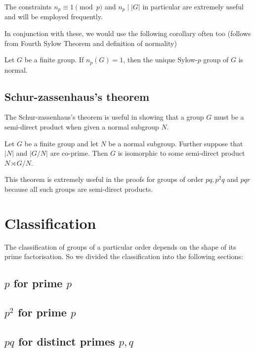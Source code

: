 The constraints $n_p \equiv 1 \pmod p$ and $n_p \mid |G|$ in particular are extremely useful and will be employed frequently.

In conjunction with these, we would use the following corollary often too (follows from Fourth Sylow Theorem and definition of normality)
\begin{corollary}
    Let $G$ be a finite group. If $n_p(G) = 1$, then the unique Sylow-$p$ group of $G$ is normal.
\end{corollary}

\subsection{Schur-zassenhaus's theorem}

The Schur-zassenhaus's theorem is useful in showing that a group $G$ must be a semi-direct product when given a normal subgroup $N$.

\begin{theorem}
    Let $G$ be a finite group and let $N$ be a normal subgroup. Further suppose that $|N|$ and $|G/N|$ are co-prime. Then $G$ is isomorphic to some semi-direct product $N \rtimes G/N$.
\end{theorem}

This theorem is extremely useful in the proofs for groups of order $pq, p^2 q$ and $pqr$ because all such groups are semi-direct products.

\section{Classification}

The classification of groups of a particular order depends on the shape of its prime factorisation. So we divided the classification into the following sections:

\subsection{$p$ for prime $p$}
\label{$p$ for prime $p$}

\subsection{$p^2$ for prime $p$}
\label{$p^2$ for prime $p$}

\subsection{$pq$ for distinct primes $p, q$}
\label{$pq$ for distinct primes $p, q$}

